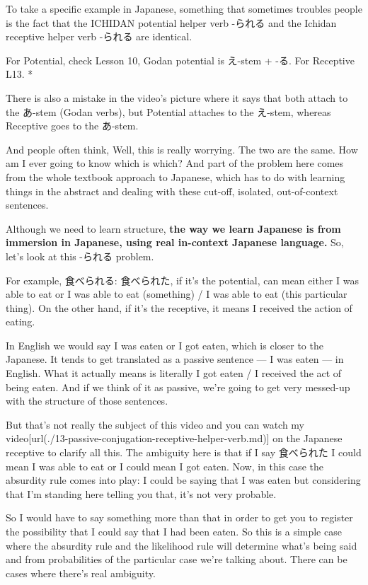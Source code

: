 To take a specific example in Japanese, something that sometimes troubles people is the fact that the ICHIDAN potential helper verb -られる and the Ichidan receptive helper verb -られる are identical.

For Potential, check Lesson 10, Godan potential is え-stem + -る. For Receptive L13. *{}

There is also a mistake in the video's picture where it says that both attach to the あ-stem (Godan verbs), but Potential attaches to the え-stem, whereas Receptive goes to the あ-stem.

And people often think, Well, this is really worrying. The two are the same. How am I ever going to know which is which? And part of the problem here comes from the whole textbook approach to Japanese, which has to do with learning things in the abstract and dealing with these cut-off, isolated, out-of-context sentences.

Although we need to learn structure, {\bf the way we learn Japanese is from immersion in Japanese, using real in-context Japanese language.} So, let's look at this -られる problem.

For example, 食べられる: 食べられた, if it's the potential, can mean either I was able to eat or I was able to eat (something) / I was able to eat (this particular thing). On the other hand, if it's the receptive, it means I received the action of eating.

In English we would say I was eaten or I got eaten, which is closer to the Japanese. It tends to get translated as a passive sentence --- I was eaten --- in English. What it actually means is literally I got eaten / I received the act of being eaten. And if we think of it as passive, we're going to get very messed-up with the structure of those sentences.

But that's not really the subject of this video and you can watch my video\goto{{[}13{]}}[url(./13-passive-conjugation-receptive-helper-verb.md)] on the Japanese receptive to clarify all this. The ambiguity here is that if I say 食べられた I could mean I was able to eat or I could mean I got eaten. Now, in this case the absurdity rule comes into play: I could be saying that I was eaten but considering that I'm standing here telling you that, it's not very probable.

So I would have to say something more than that in order to get you to register the possibility that I could say that I had been eaten. So this is a simple case where the absurdity rule and the likelihood rule will determine what's being said and from probabilities of the particular case we're talking about. There can be cases where there's real ambiguity.

